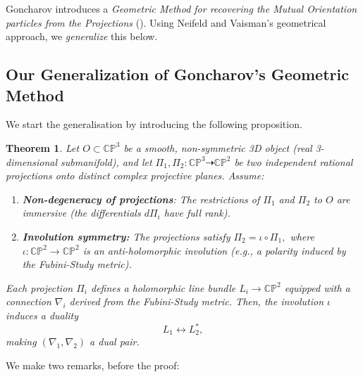 \documentclass[runningheads]{llncs}
\newtheorem{thm}{Theorem}
\begin{document}
Goncharov introduces a {\it Geometric Method for recovering the Mutual Orientation particles
from the Projections} (\cite[Sec. 2]{G}). Using Neifeld and Vaisman's geometrical approach,  we {\it generalize} this below. 

\subsection{Our Generalization of Goncharov's Geometric Method } We start the generalisation by introducing the following proposition. 
\begin{thm}\label{P:1} Let \( O \subset \mathbb{CP}^3 \) be a smooth, non-symmetric 3D object (real 3-dimensional submanifold), and let \( \Pi_1, \Pi_2: \mathbb{CP}^3 \dashrightarrow \mathbb{CP}^2 \) be two independent rational projections onto distinct complex projective planes. Assume:

\begin{enumerate}
\item  {\bf Non-degeneracy of projections}: The restrictions of \( \Pi_1 \) and \( \Pi_2 \) to \( O \) are immersive (the differentials \( d\Pi_i \) have full rank).

\item  {\bf Involution symmetry:} The projections satisfy \(\Pi_2 = \iota \circ \Pi_1 ,\) where \( \iota: \mathbb{CP}^2 \to \mathbb{CP}^2 \) is an anti-holomorphic involution (e.g., a polarity induced by the Fubini-Study metric).

\end{enumerate}

Each projection \( \Pi_i \) defines a holomorphic line bundle \( L_i \to \mathbb{CP}^2 \) equipped with a connection \( \nabla_i \) derived from the Fubini-Study metric. Then, the  involution \( \iota \) induces a duality \[ L_1 \leftrightarrow L_2^* ,\] making \( (\nabla_1, \nabla_2) \) a dual pair.
\end{thm}
We make two remarks, before the proof: 
\end{document}
